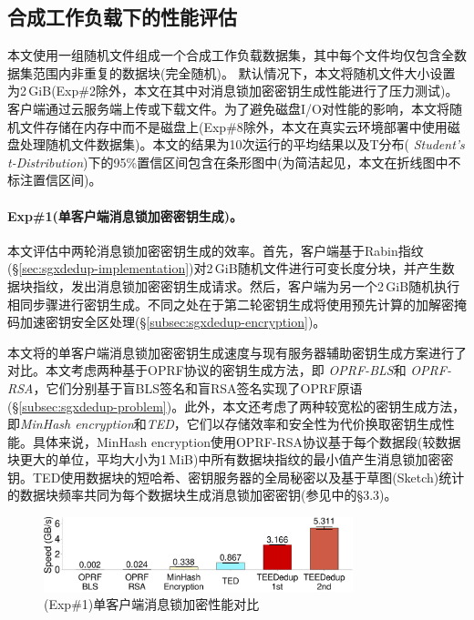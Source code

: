 \subsection{合成工作负载下的性能评估}
\label{subsec:sgxdedup-synthetic}

本文使用一组随机文件组成一个合成工作负载数据集，其中每个文件均仅包含全数据集范围内非重复的数据块(完全随机)。 默认情况下，本文将随机文件大小设置为2\,GiB(Exp\#2除外，本文在其中对消息锁加密密钥生成性能进行了压力测试)。 客户端通过云服务端上传或下载文件。为了避免磁盘I/O对性能的影响，本文将随机文件存储在内存中而不是磁盘上(Exp\#8除外，本文在真实云环境部署中使用磁盘处理随机文件数据集)。本文的结果为10次运行的平均结果以及T分布(\textit{ Student's t-Distribution})下的95\%置信区间包含在条形图中(为简洁起见，本文在折线图中不标注置信区间)。

\paragraph*{Exp\#1(单客户端消息锁加密密钥生成)。}本文评估\sysnameS 中两轮消息锁加密密钥生成的效率。首先，客户端基于Rabin指纹(\S\ref{sec:sgxdedup-implementation})对2\,GiB随机文件进行可变长度分块，并产生数据块指纹，发出消息锁加密密钥生成请求。然后，客户端为另一个2\,GiB随机执行相同步骤进行密钥生成。不同之处在于第二轮密钥生成将使用预先计算的加解密掩码加速密钥安全区处理(\S\ref{subsec:sgxdedup-encryption})。

本文将\sysnameS 的单客户端消息锁加密密钥生成速度与现有服务器辅助密钥生成方案进行了对比。本文考虑两种基于OPRF协议的密钥生成方法，即 \textit{OPRF-BLS}\cite{armknecht2015transparent}和\textit{ OPRF-RSA}\cite{bellare2013DupLESS}，它们分别基于盲BLS签名和盲RSA签名实现了OPRF原语(\S\ref{subsec:sgxdedup-problem})。此外，本文还考虑了两种较宽松的密钥生成方法，即\textit{MinHash encryption}\cite{qin17}和\textit{TED}\cite{li2020TED}，它们以存储效率和安全性为代价换取密钥生成性能。具体来说，MinHash encryption使用OPRF-RSA协议基于每个数据段(较数据块更大的单位，平均大小为1\,MiB)中所有数据块指纹的最小值产生消息锁加密密钥。TED使用数据块的短哈希、密钥服务器的全局秘密以及基于草图(Sketch)统计的数据块频率共同为每个数据块生成消息锁加密密钥(参见\cite{li2020TED}中的\S3.3)。

\begin{figure}[!htb]
    \centering
    \includegraphics[width=0.8\textwidth]{pic/sgxdedup/expa2_keyGenPerformance.pdf}
    \caption{(Exp\#1)单客户端消息锁加密性能对比}
    \label{fig:sgxdedup-keygen-comparison}
\end{figure}

